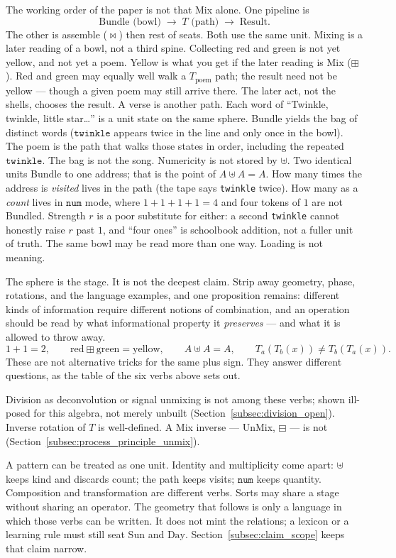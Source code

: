 \documentclass[12pt, a4paper]{article}
\begin{document}
The working order of the paper is not that Mix alone. One pipeline is
\[
\text{Bundle (bowl)} \;\longrightarrow\; T\text{ (path)} \;\longrightarrow\; \text{Result}.
\]
The other is assemble ($\bowtie$) then rest of seats. Both use the
same unit. Mixing is a later reading of a bowl, not a third spine.
Collecting red and green is not yet yellow, and not yet a poem.
Yellow is what you get if the later reading is Mix ($\boxplus$).
Red and green may equally well walk a $T_{\mathrm{poem}}$ path; the
result need not be yellow --- though a given poem may still arrive
there. The later act, not the shells, chooses the result. A verse is
another path.
Each word of ``Twinkle, twinkle, little star\ldots'' is a unit state
on the same sphere. Bundle yields the bag of distinct words
($\texttt{twinkle}$ appears twice in the line and only once in the
bowl). The poem is the path that walks those states in order,
including the repeated $\texttt{twinkle}$. The bag is not the song.
Numericity is not stored by $\uplus$. Two identical units Bundle
to one address; that is the point of $A\uplus A=A$. How many times
the address is \emph{visited} lives in the path (the tape says
\texttt{twinkle} twice). How many as a \emph{count} lives in
$\mathtt{num}$ mode, where $1+1+1+1=4$ and four tokens of $1$ are
not Bundled. Strength $r$ is a poor substitute for either: a
second \texttt{twinkle} cannot honestly raise $r$ past $1$, and
``four ones'' is schoolbook addition, not a fuller unit of truth.
The same bowl may be read more than one way. Loading is not meaning.

The sphere is the stage. It is not the deepest claim. Strip away
geometry, phase, rotations, and the language examples, and one
proposition remains: different kinds of information require different
notions of combination, and an operation should be read by what
informational property it \emph{preserves} --- and what it is allowed
to throw away.
\[
1+1=2,
\qquad
\mathrm{red}\boxplus\mathrm{green}=\mathrm{yellow},
\qquad
A\uplus A=A,
\qquad
T_a(T_b(x))\neq T_b(T_a(x)).
\]
These are not alternative tricks for the same plus sign. They answer
different questions, as the table of the six verbs above sets out.

Division as deconvolution or signal unmixing is not among these
verbs; shown ill-posed for this algebra, not merely unbuilt
(Section~\ref{subsec:division_open}).
Inverse rotation of $T$ is well-defined. A Mix inverse ---
UnMix, $\boxminus$ --- is not
(Section~\ref{subsec:process_principle_unmix}).

A pattern can be treated as one unit. Identity and multiplicity come
apart: $\uplus$ keeps kind and discards count; the path keeps visits;
$\mathtt{num}$ keeps quantity. Composition and transformation are
different verbs. Sorts may share a stage without sharing an operator.
The geometry that follows is only a language in which those verbs can
be written. It does not mint the relations; a lexicon or a learning
rule must still seat $\mathrm{Sun}$ and $\mathrm{Day}$.
Section~\ref{subsec:claim_scope} keeps that claim narrow.
\end{document}
